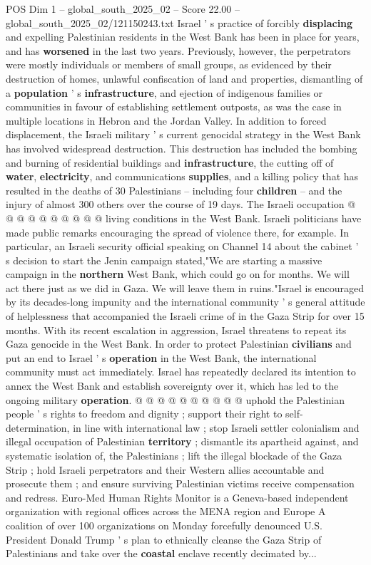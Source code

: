 \begin{textsample}{POS Dim 1 – global\_south\_2025\_02 – Score 22.00 – global\_south\_2025\_02/121150243.txt}
Israel ' s practice of forcibly \textbf{displacing} and expelling Palestinian residents in the West Bank has been in place for years, and has \textbf{worsened} in the last two years.
Previously, however, the perpetrators were mostly individuals or members of small groups, as evidenced by their destruction of homes, unlawful confiscation of land and properties, dismantling of a \textbf{population} ' s \textbf{infrastructure}, and ejection of indigenous families or communities in favour of establishing settlement outposts, as was the case in multiple locations in Hebron and the Jordan Valley.
In addition to forced displacement, the Israeli military ' s current genocidal strategy in the West Bank has involved widespread destruction.
This destruction has included the bombing and burning of residential buildings and \textbf{infrastructure}, the cutting off of \textbf{water}, \textbf{electricity}, and communications \textbf{supplies}, and a killing policy that has resulted in the deaths of 30 Palestinians -- including four \textbf{children} -- and the injury of almost 300 others over the course of 19 days.
The Israeli occupation @ @ @ @ @ @ @ @ @ @ living conditions in the West Bank.
Israeli politicians have made public remarks encouraging the spread of violence there, for example.
In particular, an Israeli security official speaking on Channel 14 about the cabinet ' s decision to start the Jenin campaign stated,"We are starting a massive campaign in the \textbf{northern} West Bank, which could go on for months.
We will act there just as we did in Gaza.
We will leave them in ruins."Israel is encouraged by its decades-long impunity and the international community ' s general attitude of helplessness that accompanied the Israeli crime of in the Gaza Strip for over 15 months.
With its recent escalation in aggression, Israel threatens to repeat its Gaza genocide in the West Bank.
In order to protect Palestinian \textbf{civilians} and put an end to Israel ' s \textbf{operation} in the West Bank, the international community must act immediately.
Israel has repeatedly declared its intention to annex the West Bank and establish sovereignty over it, which has led to the ongoing military \textbf{operation}. @ @ @ @ @ @ @ @ @ @ uphold the Palestinian people ' s rights to freedom and dignity ; support their right to self-determination, in line with international law ; stop Israeli settler colonialism and illegal occupation of Palestinian \textbf{territory} ; dismantle its apartheid against, and systematic isolation of, the Palestinians ; lift the illegal blockade of the Gaza Strip ; hold Israeli perpetrators and their Western allies accountable and prosecute them ; and ensure surviving Palestinian victims receive compensation and redress.
Euro-Med Human Rights Monitor is a Geneva-based independent organization with regional offices across the MENA region and Europe A coalition of over 100 organizations on Monday forcefully denounced U.S.
President Donald Trump ' s plan to ethnically cleanse the Gaza Strip of Palestinians and take over the \textbf{coastal} enclave recently decimated by...


\end{textsample}
